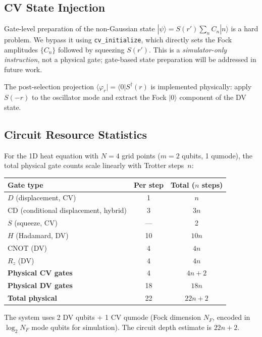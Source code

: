 \documentclass[11pt]{article}
\begin{document}
\subsection{CV State Injection}

Gate-level preparation of the non-Gaussian state
$|\psi\rangle = S(r')\sum_n C_n|n\rangle$ is a hard problem.
We bypass it using \texttt{cv\_initialize}, which directly sets the
Fock amplitudes $\{C_n\}$ followed by squeezing $S(r')$.
This is a \emph{simulator-only instruction}, not a physical gate;
gate-based state preparation will be addressed in future work.

The post-selection projection $\langle\varphi_r| = \langle 0|S^\dagger(r)$
is implemented physically: apply $S(-r)$ to the oscillator mode and
extract the Fock $|0\rangle$ component of the DV state.

\subsection{Circuit Resource Statistics}

For the 1D heat equation with $N=4$ grid points ($m=2$ qubits, 1 qumode),
the total physical gate counts scale linearly with Trotter steps~$n$:

\begin{center}
\begin{tabular}{lcc}
  \toprule
  Gate type & Per step & Total ($n$ steps) \\
  \midrule
  $D$ (displacement, CV) & 1 & $n$ \\
  CD (conditional displacement, hybrid) & 3 & $3n$ \\
  $S$ (squeeze, CV) & --- & 2 \\
  $H$ (Hadamard, DV) & 10 & $10n$ \\
  CNOT (DV) & 4 & $4n$ \\
  $R_z$ (DV) & 4 & $4n$ \\
  \midrule
  \textbf{Physical CV gates} & 4 & $4n + 2$ \\
  \textbf{Physical DV gates} & 18 & $18n$ \\
  \textbf{Total physical} & 22 & $22n + 2$ \\
  \bottomrule
\end{tabular}
\end{center}

\noindent
The system uses 2 DV qubits + 1 CV qumode (Fock dimension $N_F$,
encoded in $\log_2 N_F$ mode qubits for simulation).
The circuit depth estimate is $22n + 2$.
\end{document}

